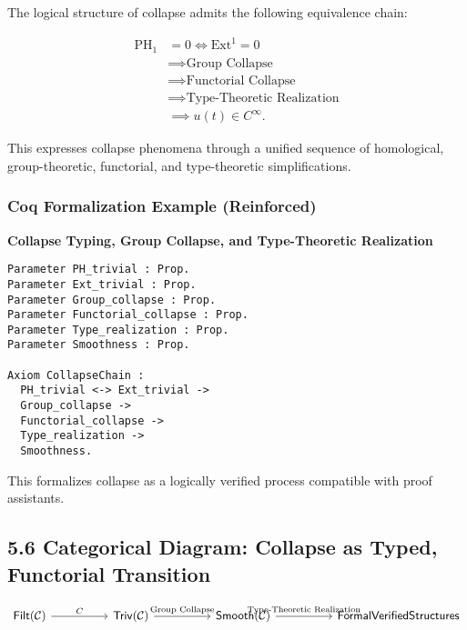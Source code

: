 \documentclass[11pt]{article}
\begin{document}
The logical structure of collapse admits the following equivalence chain:

\[
\begin{aligned}
\mathrm{PH}_1 &= 0 
\iff \mathrm{Ext}^1 = 0 \\
&\implies \text{Group Collapse} \\
&\implies \text{Functorial Collapse} \\
&\implies \text{Type-Theoretic Realization} \\
&\implies u(t) \in C^\infty.
\end{aligned}
\]


This expresses collapse phenomena through a unified sequence of homological, group-theoretic, functorial, and type-theoretic simplifications.

\subsubsection*{Coq Formalization Example (Reinforced)}

\begin{center}
\textbf{Collapse Typing, Group Collapse, and Type-Theoretic Realization}
\end{center}

\begin{lstlisting}[language=Coq]
Parameter PH_trivial : Prop.
Parameter Ext_trivial : Prop.
Parameter Group_collapse : Prop.
Parameter Functorial_collapse : Prop.
Parameter Type_realization : Prop.
Parameter Smoothness : Prop.

Axiom CollapseChain :
  PH_trivial <-> Ext_trivial ->
  Group_collapse ->
  Functorial_collapse ->
  Type_realization ->
  Smoothness.
\end{lstlisting}


This formalizes collapse as a logically verified process compatible with proof assistants.

\subsection*{5.6 Categorical Diagram: Collapse as Typed, Functorial Transition}

\[
\begin{tikzcd}[column sep=huge]
\mathsf{Filt}(\mathcal{C}) \arrow[r, "C"]
& \mathsf{Triv}(\mathcal{C}) \arrow[r, "\text{Group Collapse}"]
& \mathsf{Smooth}(\mathcal{C}) \arrow[r, "\text{Type-Theoretic Realization}"]
& \mathsf{Formal Verified Structures}
\end{tikzcd}
\]
\end{document}
